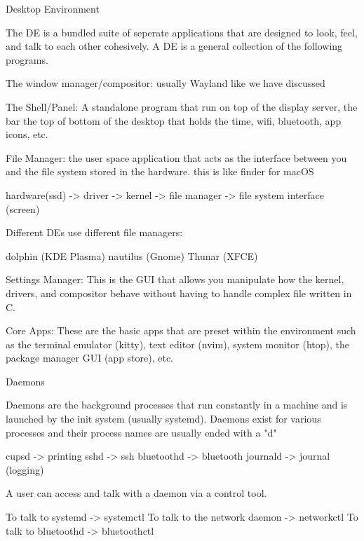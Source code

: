 \documentclass[10pt]{article}
\begin{document}
    \begin{core}{Desktop Environment}

      The DE is a bundled suite of seperate applications that are designed to look, feel, and talk to each other cohesively. A DE is a general collection of the following programs.

        The window manager/compositor: usually Wayland like we have discussed

        The Shell/Panel: A standalone program that run on top of the display server, the bar the top of bottom of the desktop that holds the time, wifi, bluetooth, app icons, etc.

        File Manager: the user space application that acts as the interface between you and the file system stored in the hardware. this is like finder for macOS

          hardware(ssd) -> driver -> kernel -> file manager -> file system interface (screen)

          Different DEs use different file managers:

            dolphin (KDE Plasma)
            nautilus (Gnome)
            Thunar (XFCE)

        Settings Manager: This is the GUI that allows you manipulate how the kernel, drivers, and compositor behave without having to handle complex file written in C.

        Core Apps: These are the basic apps that are preset within the environment such as the terminal emulator (kitty), text editor (nvim), system monitor (htop), the package manager GUI (app store), etc.

    \end{core}

    \begin{core}{Daemons}

      Daemons are the background processes that run constantly in a machine and is launched by the init system (usually systemd). Daemons exist for various processes and their process names are usually ended with a "d"

        cupsd -> printing
        sshd -> ssh
        bluetoothd -> bluetooth
        journald -> journal (logging)

      A user can access and talk with a daemon via a control tool.

        To talk to systemd -> systemctl
        To talk to the network daemon -> networkctl
        To talk to bluetoothd -> bluetoothctl

    \end{core}  
\end{document}
